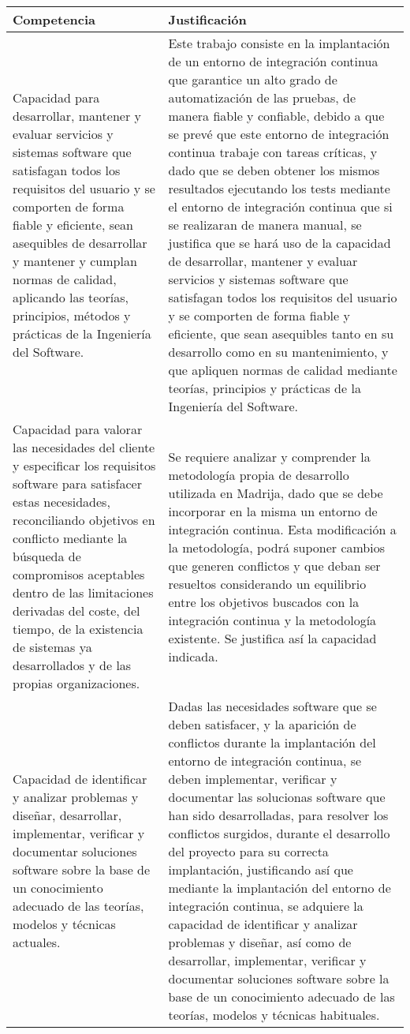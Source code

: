 \begin{center}
\begin{longtable}{p{} p{}}
\hline \hline
  \textbf{Competencia} & \textbf{Justificación} \\
    \hline \hline
    Capacidad para desarrollar, mantener y evaluar servicios y sistemas software que satisfagan todos los requisitos del usuario y se comporten de forma fiable y eficiente, sean asequibles de desarrollar y mantener y cumplan normas de calidad, aplicando las teorías, principios, métodos y prácticas de la Ingeniería del Software. & Este trabajo consiste en la implantación de un entorno de integración continua que garantice un alto grado de automatización de las pruebas, de manera fiable y confiable, debido a que se prevé que este entorno de integración continua trabaje con tareas críticas, y dado que se deben obtener los mismos resultados ejecutando los tests mediante el entorno de integración continua que si se realizaran de manera manual, se justifica que se hará uso de la capacidad de desarrollar, mantener y evaluar servicios y sistemas software que satisfagan todos los requisitos del usuario y se comporten de forma fiable y eficiente, que sean asequibles tanto en su desarrollo como en su mantenimiento, y que apliquen normas de calidad mediante teorías, principios y prácticas de la Ingeniería del Software.\\
    \hline\hline
    Capacidad para valorar las necesidades del cliente y especificar los requisitos software para satisfacer estas necesidades, reconciliando objetivos en conflicto mediante la búsqueda de compromisos aceptables dentro de las limitaciones derivadas del coste, del tiempo, de la existencia de sistemas ya desarrollados y de las propias organizaciones. & Se requiere analizar y comprender la metodología propia de desarrollo utilizada en Madrija, dado que se debe incorporar en la misma un entorno de integración continua. Esta modificación a la metodología, podrá suponer cambios que generen conflictos y que deban ser resueltos considerando un equilibrio entre los objetivos buscados con la integración continua y la metodología existente. Se justifica así la capacidad indicada.\\
    \hline \hline
    Capacidad de identificar y analizar problemas y diseñar, desarrollar, implementar, verificar y documentar soluciones software sobre la base de un conocimiento adecuado de las teorías, modelos y técnicas actuales. & Dadas las necesidades software que se deben satisfacer,  y la aparición de conflictos durante la implantación del entorno de integración continua, se deben implementar, verificar y documentar las solucionas software que han sido desarrolladas, para resolver los conflictos surgidos, durante el desarrollo del proyecto para su correcta implantación, justificando así que mediante la implantación del entorno de integración continua, se adquiere la capacidad de identificar y analizar problemas y diseñar, así como de desarrollar, implementar, verificar y documentar soluciones software sobre la base de un conocimiento adecuado de las teorías, modelos y técnicas habituales.\\

\end{longtable}
\end{center}
